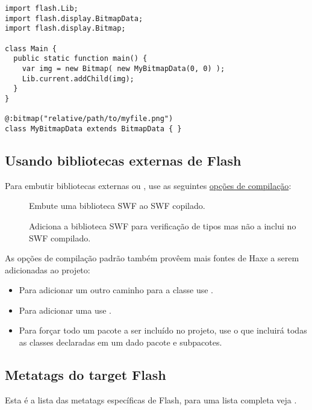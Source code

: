 \begin{lstlisting}
import flash.Lib;
import flash.display.BitmapData;
import flash.display.Bitmap;

class Main {
  public static function main() {
    var img = new Bitmap( new MyBitmapData(0, 0) );
    Lib.current.addChild(img);
  }
}

@:bitmap("relative/path/to/myfile.png") 
class MyBitmapData extends BitmapData { }
\end{lstlisting}

\subsection{Usando bibliotecas externas de Flash}
\label{target-flash-external-libraries}

Para embutir bibliotecas externas  ou , use as seguintes \href{http://haxe.org/documentation/introduction/compiler-usage.html}{opções de compilação}:

\begin{description}
	\item[] Embute uma biblioteca SWF ao SWF copilado.
	\item[] Adiciona a biblioteca SWF para verificação de tipos mas não a inclui no SWF compilado.
\end{description}

As opções de compilação padrão também provêem mais fontes de Haxe a serem adicionadas ao projeto: 
\begin{itemize}
	\item Para adicionar um outro caminho para a classe use .
	\item Para adicionar uma  use .
	\item Para forçar todo um pacote a ser incluído no projeto, use  o que incluirá todas as classes declaradas em um dado pacote e subpacotes. 
\end{itemize}

\subsection{Metatags do target Flash}
\label{target-flash-metatags}

Esta é a lista das metatags específicas de Flash, para uma lista completa veja .

